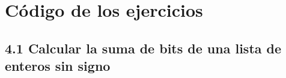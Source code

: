 	
	\section[Código de los ejercicios]{Código de los ejercicios}
	
	
	\subsection{4.1 Calcular la suma de bits de una lista de enteros sin signo}
	
